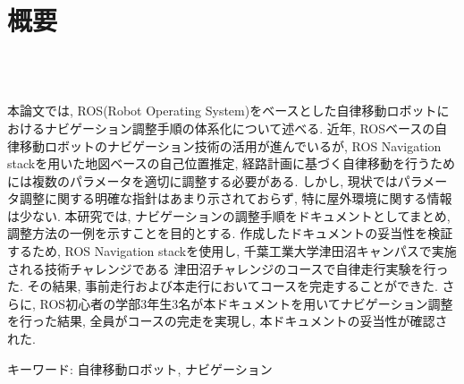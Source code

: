\chapter*{概要}
\thispagestyle{empty}
%
\begin{center}
  \scalebox{1.5}{ROSベースの自律移動ロボットにおける}\\
  \scalebox{1.5}{ナビゲーション調整手順の体系化}\\
\end{center}
\vspace{1.0zh}
%

本論文では, ROS(Robot Operating System)をベースとした自律移動ロボットにおけるナビゲーション調整手順の体系化について述べる. 
近年, ROSベースの自律移動ロボットのナビゲーション技術の活用が進んでいるが, ROS Navigation stackを用いた地図ベースの自己位置推定, 経路計画に基づく自律移動を行うためには複数のパラメータを適切に調整する必要がある. 
しかし, 現状ではパラメータ調整に関する明確な指針はあまり示されておらず, 特に屋外環境に関する情報は少ない. 
本研究では, ナビゲーションの調整手順をドキュメントとしてまとめ, 調整方法の一例を示すことを目的とする. 
作成したドキュメントの妥当性を検証するため, ROS Navigation stackを使用し, 千葉工業大学津田沼キャンパスで実施される技術チャレンジである
津田沼チャレンジのコースで自律走行実験を行った. その結果, 事前走行および本走行においてコースを完走することができた. 
さらに, ROS初心者の学部3年生3名が本ドキュメントを用いてナビゲーション調整を行った結果, 全員がコースの完走を実現し, 本ドキュメントの妥当性が確認された. 

\vspace{1.0zh}

キーワード: 自律移動ロボット, ナビゲーション
%
\newpage
